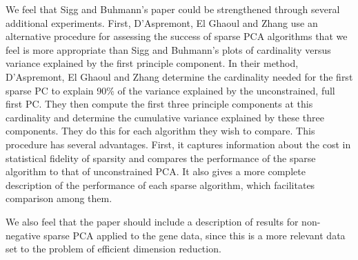 \documentclass{article}
\begin{document}
We feel that Sigg and Buhmann's paper could be strengthened
through several additional experiments. First,
D'Aspremont, El Ghaoul and Zhang
use an alternative procedure for assessing the success of
sparse PCA algorithms that we feel is more appropriate than
Sigg and Buhmann's plots of cardinality versus variance explained
by the first principle component.
In their method, D'Aspremont, El Ghaoul and Zhang
determine the cardinality needed for the
first sparse PC to explain 90\% of the variance explained
by the unconstrained, full first PC.
They then compute the first three principle components at this
cardinality and determine the cumulative variance explained by
these three components. They do this for each algorithm they
wish to compare. This procedure has several advantages.
First, it captures information about the cost in statistical
fidelity of sparsity and compares the performance of the sparse algorithm
to that of unconstrained PCA. It also gives a more complete
description of the performance of each sparse algorithm, which
facilitates comparison among them.

We also feel that the paper should include a description of
results for non-negative sparse PCA applied to the gene data,
since this is a more relevant data set to the problem of
efficient dimension reduction.
\end{document}
